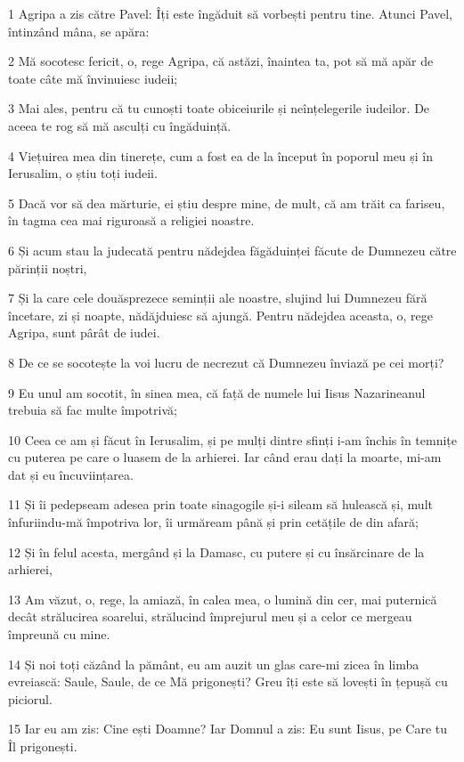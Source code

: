 \par 1 Agripa a zis către Pavel: Îți este îngăduit să vorbești pentru tine. Atunci Pavel, întinzând mâna, se apăra:
\par 2 Mă socotesc fericit, o, rege Agripa, că astăzi, înaintea ta, pot să mă apăr de toate câte mă învinuiesc iudeii;
\par 3 Mai ales, pentru că tu cunoști toate obiceiurile și neînțelegerile iudeilor. De aceea te rog să mă asculți cu îngăduință.
\par 4 Viețuirea mea din tinerețe, cum a fost ea de la început în poporul meu și în Ierusalim, o știu toți iudeii.
\par 5 Dacă vor să dea mărturie, ei știu despre mine, de mult, că am trăit ca fariseu, în tagma cea mai riguroasă a religiei noastre.
\par 6 Și acum stau la judecată pentru nădejdea făgăduinței făcute de Dumnezeu către părinții noștri,
\par 7 Și la care cele douăsprezece seminții ale noastre, slujind lui Dumnezeu fără încetare, zi și noapte, nădăjduiesc să ajungă. Pentru nădejdea aceasta, o, rege Agripa, sunt pârât de iudei.
\par 8 De ce se socotește la voi lucru de necrezut că Dumnezeu înviază pe cei morți?
\par 9 Eu unul am socotit, în sinea mea, că față de numele lui Iisus Nazarineanul trebuia să fac multe împotrivă;
\par 10 Ceea ce am și făcut în Ierusalim, și pe mulți dintre sfinți i-am închis în temnițe cu puterea pe care o luasem de la arhierei. Iar când erau dați la moarte, mi-am dat și eu încuviințarea.
\par 11 Și îi pedepseam adesea prin toate sinagogile și-i sileam să hulească și, mult înfuriindu-mă împotriva lor, îi urmăream până și prin cetățile de din afară;
\par 12 Și în felul acesta, mergând și la Damasc, cu putere și cu însărcinare de la arhierei,
\par 13 Am văzut, o, rege, la amiază, în calea mea, o lumină din cer, mai puternică decât strălucirea soarelui, strălucind împrejurul meu și a celor ce mergeau împreună cu mine.
\par 14 Și noi toți căzând la pământ, eu am auzit un glas care-mi zicea în limba evreiască: Saule, Saule, de ce Mă prigonești? Greu îți este să lovești în țepușă cu piciorul.
\par 15 Iar eu am zis: Cine ești Doamne? Iar Domnul a zis: Eu sunt Iisus, pe Care tu Îl prigonești.
